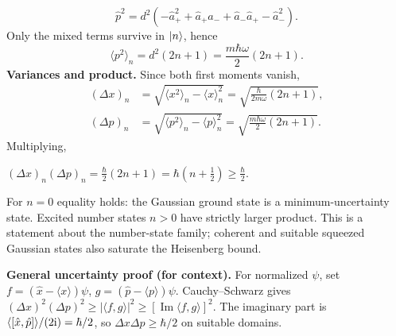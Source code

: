\documentclass[11pt,a4paper]{article}
\newcommand{\key}[1]{\begin{resultbox}\centering\(\displaystyle #1\)\end{resultbox}}
\newcommand{\avg}[1]{\langle #1\rangle}\newcommand{\Sch}{Schr\"odinger}
\begin{document}
\begin{equation}\hat p^2=d^2\left(-\hat a_+^2+\hat a_+\hat a_-+\hat a_-\hat a_+-\hat a_-^2\right).\end{equation}
Only the mixed terms survive in \(|n\rangle\), hence
\begin{equation}\boxed{\avg{p^2}_n=d^2(2n+1)=\frac{m\hbar\omega}{2}(2n+1).}\end{equation}
\textbf{Variances and product.} Since both first moments vanish,
\begin{align}
(\Delta x)_n&=\sqrt{\avg{x^2}_n-\avg x_n^2}=\sqrt{\frac{\hbar}{2m\omega}(2n+1)},\\
(\Delta p)_n&=\sqrt{\avg{p^2}_n-\avg p_n^2}=\sqrt{\frac{m\hbar\omega}{2}(2n+1)}.
\end{align}
Multiplying,
\key{\boxed{(\Delta x)_n(\Delta p)_n=\frac{\hbar}{2}(2n+1)=\hbar\left(n+\frac12\right)\ge\frac\hbar2.}}
For \(n=0\) equality holds: the Gaussian ground state is a minimum-uncertainty state. Excited number states \(n>0\) have strictly larger product. This is a statement about the number-state family; coherent and suitable squeezed Gaussian states also saturate the Heisenberg bound.

\textbf{General uncertainty proof (for context).} For normalized \(\psi\), set \(f=(\hat x-\avg x)\psi\), \(g=(\hat p-\avg p)\psi\). Cauchy--Schwarz gives \((\Delta x)^2(\Delta p)^2\ge|\langle f,g\rangle|^2\ge[\operatorname{Im}\langle f,g\rangle]^2\). The imaginary part is \(\avg{[\hat x,\hat p]}/(2\iu)=\hbar/2\), so \(\Delta x\Delta p\ge\hbar/2\) on suitable domains.
\end{document}
